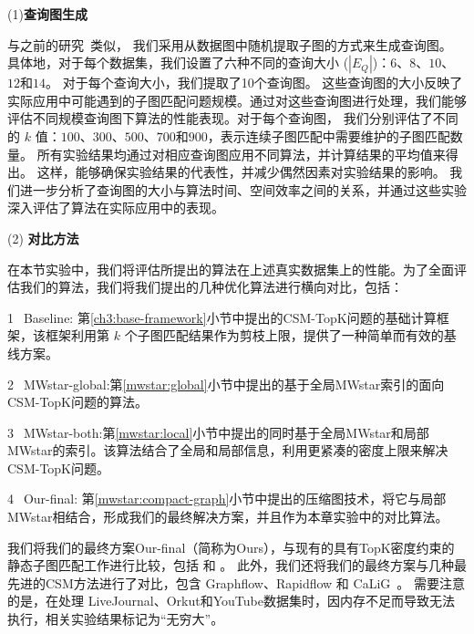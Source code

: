 (1)\textbf{查询图生成}
\label{ss-sec:querygen}

与之前的研究~\cite{csm-turboflux-DBLP:conf/sigmod/KimSHLHCSJ18,csm-symbi-DBLP:journals/pvldb/MinPPGIH21,csm-survey:DBLP:journals/pvldb/SunSLH22}类似，
我们采用从数据图中随机提取子图的方式来生成查询图。
具体地，对于每个数据集，我们设置了六种不同的查询大小 ($|E_Q|$)：$6$、$8$、$10$、$12$和$14$。
对于每个查询大小，我们提取了10个查询图。
这些查询图的大小反映了实际应用中可能遇到的子图匹配问题规模。通过对这些查询图进行处理，我们能够评估不同规模查询图下算法的性能表现。对于每个查询图，
我们分别评估了不同的 $k$ 值：$100$、$300$、$500$、$700$和$900$，表示连续子图匹配中需要维护的子图匹配数量。
所有实验结果均通过对相应查询图应用不同算法，并计算结果的平均值来得出。
这样，能够确保实验结果的代表性，并减少偶然因素对实验结果的影响。
我们进一步分析了查询图的大小与算法时间、空间效率之间的关系，并通过这些实验深入评估了算法在实际应用中的表现。

(2) \textbf{对比方法}

在本节实验中，我们将评估所提出的算法在上述真实数据集上的性能。为了全面评估我们的算法，我们将我们提出的几种优化算法进行横向对比，包括：

\textcircled{1}~Baseline: 第\ref{ch3:base-framework}小节中提出的CSM-TopK问题的基础计算框架，该框架利用第 $k$ 个子图匹配结果作为剪枝上限，提供了一种简单而有效的基线方案。

\textcircled{2}~MWstar-global:第\ref{mwstar:global}小节中提出的基于全局MWstar索引的面向CSM-TopK问题的算法。

\textcircled{3}~MWstar-both:第\ref{mwstar:local}小节中提出的同时基于全局MWstar和局部MWstar的索引。该算法结合了全局和局部信息，利用更紧凑的密度上限来解决CSM-TopK问题。

\textcircled{4}~Our-final: 第\ref{mwstar:compact-graph}小节中提出的压缩图技术，将它与局部MWstar相结合，形成我们的最终解决方案，并且作为本章实验中的对比算法。


我们将我们的最终方案Our-final（简称为Ours），与现有的具有TopK密度约束的静态子图匹配工作进行比较，包括 \itk\cite{static-topk-Gupta-DBLP:conf/icde/GuptaGYCH14} 和 \pm\cite{static-topk-Chen-DBLP:journals/ijprai/ChenLCTL18}。
此外，我们还将我们的最终方案与几种最先进的CSM方法进行了对比，包含 Graphflow\cite{csm-graphflow-DBLP:conf/sigmod/KankanamgeSMCS17}、Rapidflow\cite{csm-rapidflow-DBLP:journals/pvldb/SunSHL22} 和 CaLiG~\cite{csm-calig-DBLP:journals/pacmmod/YangZZY23}。
需要注意的是，\itk 在处理 LiveJournal、Orkut和YouTube数据集时，因内存不足而导致无法执行，相关实验结果标记为“无穷大”。

